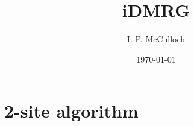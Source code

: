 \documentclass{article}[10pt]
\begin{document}
\title{iDMRG}

\author{I. P. McCulloch}
\date{\today}

\maketitle

\section{2-site algorithm}
\end{document}
